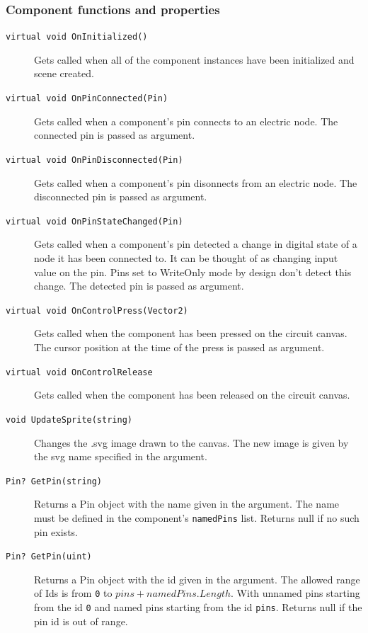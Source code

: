 \subsubsection{Component functions and properties}
\begin{description}
    \item[\texttt{virtual void OnInitialized()}]
    Gets called when all of the component instances have been initialized and scene created.

    \item[\texttt{virtual void OnPinConnected(Pin)}]
    Gets called when a component's pin connects to an electric node. The connected pin is passed as argument.

    \item[\texttt{virtual void OnPinDisconnected(Pin)}]
    Gets called when a component's pin disonnects from an electric node. The disconnected pin is passed as argument.

    \item[\texttt{virtual void OnPinStateChanged(Pin)}]
    Gets called when a component's pin detected a change in digital state of a node it has been connected to. It can be thought of as changing input value on the pin. Pins set to WriteOnly mode by design don't detect this change. The detected pin is passed as argument.

    \item[\texttt{virtual void OnControlPress(Vector2)}]
    Gets called when the component has been pressed on the circuit canvas. The cursor position at the time of the press is passed as argument.

    \item[\texttt{virtual void OnControlRelease}]
    Gets called when the component has been released on the circuit canvas.

    \item[\texttt{void UpdateSprite(string)}]
    Changes the .svg image drawn to the canvas. The new image is given by the svg name specified in the argument.

    \item[\texttt{Pin? GetPin(string)}]
    Returns a Pin object with the name given in the argument. The name must be defined in the component's \texttt{namedPins} list. Returns null if no such pin exists.

    \item[\texttt{Pin? GetPin(uint)}]
    Returns a Pin object with the id given in the argument. The allowed range of Ids is from \texttt{0} to $pins + namedPins.Length$. With unnamed pins starting from the id \texttt{0} and named pins starting from the id \texttt{pins}. Returns null if the pin id is out of range.
\end{description}

